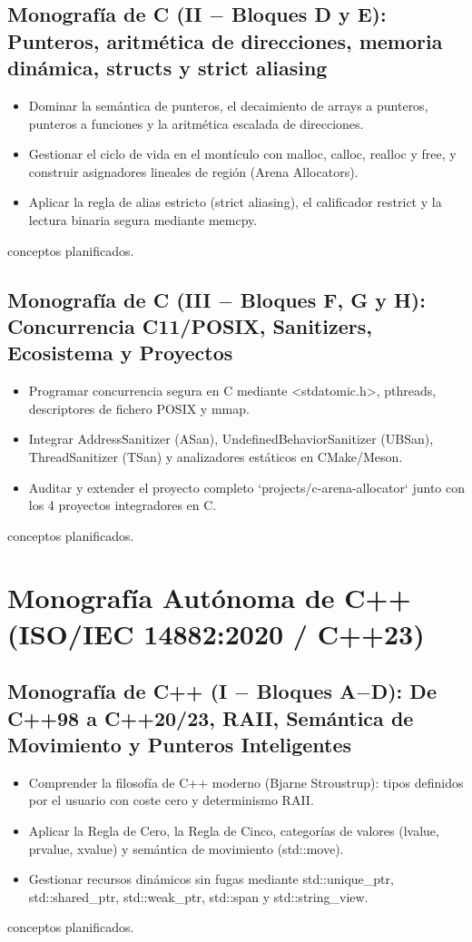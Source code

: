 \documentclass{book}
\begin{document}
\subsection*{\checkmark Monografía de C (II \(-\) Bloques D y E): Punteros, aritmética de direcciones, memoria dinámica, structs y strict aliasing}
\begin{itemize}
\item Dominar la semántica de punteros, el decaimiento de arrays a punteros, punteros a funciones y la aritmética escalada de direcciones.
\item Gestionar el ciclo de vida en el montículo con malloc, calloc, realloc y free, y construir asignadores lineales de región (Arena Allocators).
\item Aplicar la regla de alias estricto (strict aliasing), el calificador restrict y la lectura binaria segura mediante memcpy.
\end{itemize}
 conceptos planificados.

\subsection*{\checkmark Monografía de C (III \(-\) Bloques F, G y H): Concurrencia C11/POSIX, Sanitizers, Ecosistema y Proyectos}
\begin{itemize}
\item Programar concurrencia segura en C mediante <stdatomic.h>, pthreads, descriptores de fichero POSIX y mmap.
\item Integrar AddressSanitizer (ASan), UndefinedBehaviorSanitizer (UBSan), ThreadSanitizer (TSan) y analizadores estáticos en CMake/Meson.
\item Auditar y extender el proyecto completo `projects/c-arena-allocator` junto con los 4 proyectos integradores en C.
\end{itemize}
 conceptos planificados.

\section*{Monografía Autónoma de C++ (ISO/IEC 14882:2020 / C++23)}

\subsection*{\checkmark Monografía de C++ (I \(-\) Bloques A\(-\)D): De C++98 a C++20/23, RAII, Semántica de Movimiento y Punteros Inteligentes}
\begin{itemize}
\item Comprender la filosofía de C++ moderno (Bjarne Stroustrup): tipos definidos por el usuario con coste cero y determinismo RAII.
\item Aplicar la Regla de Cero, la Regla de Cinco, categorías de valores (lvalue, prvalue, xvalue) y semántica de movimiento (std::move).
\item Gestionar recursos dinámicos sin fugas mediante std::unique\_ptr, std::shared\_ptr, std::weak\_ptr, std::span y std::string\_view.
\end{itemize}
 conceptos planificados.
\end{document}
